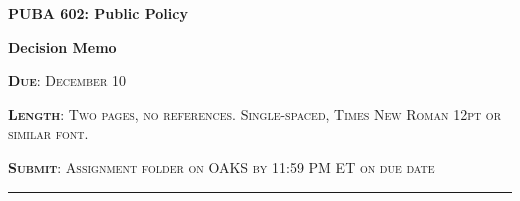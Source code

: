 \documentclass[11pt]{article}
\begin{document}
\begin{center}
\bigskip

{\bf{PUBA 602: Public Policy}}

{\bf{Decision Memo }}
\end{center} 

\noindent \textsc{{\bf{Due}}: December 10}

\noindent \textsc{{\bf{Length}}: Two pages, no references. Single-spaced, Times New Roman 12pt or similar font.}

\noindent \textsc{{\bf{Submit}}: Assignment folder on OAKS by 11:59 PM ET on due date}


\noindent\rule{\textwidth}{1pt}





  
\end{document}
